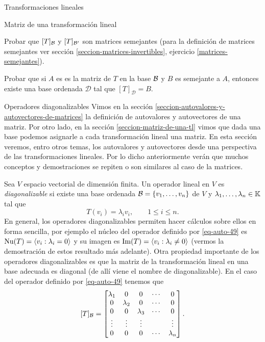 \begin{chapter}{Transformaciones lineales}
\begin{section}{Matriz de una transformaci\'on lineal}
\begin{enumex}
                \begin{enumex}
                    \item Probar que $[T]_{\mathcal{B}}$ y $[T]_{\mathcal{B}'}$  son matrices semejantes (para la definición de matrices semejantes ver sección \ref{seccion-matrices-invertibles}, ejercicio \ref{matrices-semejantes}). 
                    \item Probar que si $A$ es es la matriz de $T$  en la base $\mathcal{B}$ y $B$ es semejante a $A$,  entonces existe una base ordenada $\mathcal{D}$ tal que $[T]_{\mathcal{D}}=B$.  
                \end{enumex}
        \end{enumex}


        \end{section}    
    
        \begin{section}{Operadores diagonalizables}\label{seccion-autovalores-y-autovectores-de-una-tl}
        Vimos en la sección  \ref{seccion-autovalores-y-autovectores-de-matrices} la definición de autovalores y autovectores de una matriz. Por otro lado,  en la sección \ref{seccion-matriz-de-una-tl} vimos que dada una base podemos asignarle a cada transformación lineal una matriz. En  esta sección veremos,  entro otros temas,  los autovalores y autovectores desde una perspectiva de las transformaciones lineales. Por lo dicho anteriormente  verán que muchos conceptos y demostraciones se repiten o son similares al caso de la matrices. 
        
        Sea $V$ espacio vectorial de dimensión finita. Un operador lineal en $V$ es \textit{diagonalizable}  si existe una base ordenada $\mathcal{B}= \{v_1,\ldots,v_n\}$ de $V$ y $\lambda_1,\ldots,\lambda_n \in \mathbb K$ tal que 
        \begin{equation}\label{eq-auto-49}
            T(v_i) = \lambda_i v_i,\qquad 1\le i \le n. 
        \end{equation}
        En  general, los operadores diagonalizables permiten hacer cálculos sobre ellos en forma sencilla, por ejemplo el núcleo del  operador definido por \eqref{eq-auto-49} es $\operatorname{Nu}(T)=\langle v_i: \lambda_i =0 \rangle$ y  su imagen es $\operatorname{Im}(T)=\langle v_i: \lambda_i \not=0 \rangle$ (vermos la demostración de estos resultado más adelante). 
        Otra propiedad importante de los operadores diagonalizables es que la matriz de la transformación lineal en una base adecuada es diagonal (de allí viene el nombre de diagonalizable). En  el caso del  operador definido por \eqref{eq-auto-49} tenemos que
        $$
        [T]_{\mathcal{B}} = 
        \begin{bmatrix}
        \lambda_1&0&0&\cdots&0 \\
        0&\lambda_2&0&\cdots&0\\
        0&0&\lambda_3&\cdots&0\\
        \vdots&\vdots&\vdots&&\vdots\\
        0&0&0&\cdots&\lambda_n
        \end{bmatrix}.
        $$
        

\end{section}
\end{chapter}
